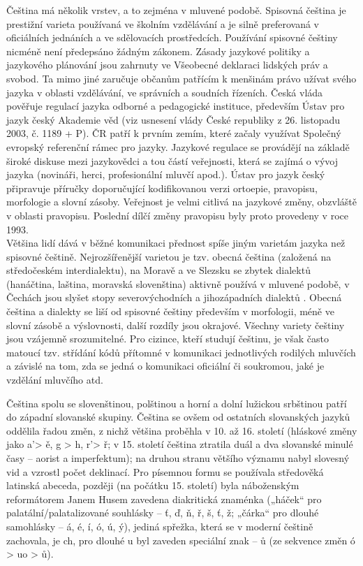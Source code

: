 \begin{multicols}{2}
Čeština má několik vrstev, a to zejména v mluvené podobě. Spisovná čeština je prestižní varieta používaná ve školním vzdělávání a je silně preferovaná v oficiálních jednáních a ve sdělovacích prostředcích. Používání spisovné češtiny nicméně není předepsáno žádným zákonem. Zásady jazykové politiky a jazykového plánování jsou zahrnuty ve Všeobecné deklaraci lidských práv a svobod. Ta mimo jiné zaručuje občanům patřícím k menšinám právo užívat svého jazyka v oblasti vzdělávání, ve správních a soudních řízeních. Česká vláda pověřuje regulací jazyka odborné a pedagogické instituce, především Ústav pro jazyk český Akademie věd (viz usnesení vlády České republiky z 26. listopadu 2003, č. 1189 + P). ČR patří k prvním zemím, které začaly využívat Společný evropský referenční rámec pro jazyky. Jazykové regulace se provádějí na základě široké diskuse mezi jazykovědci a tou částí veřejnosti, která se zajímá o vývoj jazyka (novináři, herci, profesionální mluvčí apod.). Ústav pro jazyk český připravuje příručky doporučující kodifikovanou verzi ortoepie, pravopisu, morfologie a slovní zásoby. Veřejnost je velmi citlivá na jazykové změny, obzvláště v oblasti pravopisu. Poslední dílčí změny pravopisu byly proto provedeny v roce 1993.\\
Většina lidí dává v běžné komunikaci přednost spíše jiným varietám jazyka než spisovné češtině. Nejrozšířenější varietou je tzv. obecná čeština (založená na středočeském interdialektu), na Moravě a ve Slezsku se zbytek dialektů (hanáčtina, laština, moravská slovenština) aktivně používá v mluvené podobě, v Čechách jsou slyšet stopy severovýchodních a jihozápadních dialektů \cite{Note3}. Obecná čeština a dialekty se liší od spisovné češtiny především v morfologii, méně ve slovní zásobě a výslovnosti, další rozdíly jsou okrajové. Všechny variety češtiny jsou vzájemně srozumitelné. Pro cizince, kteří studují češtinu, je však často matoucí tzv. střídání kódů přítomné v komunikaci jednotlivých rodilých mluvčích a závislé na tom, zda se jedná o komunikaci oficiální či soukromou, jaké je vzdělání mluvčího atd.

Čeština spolu se slovenštinou, polštinou a horní a dolní lužickou srbštinou patří do západní slovanské skupiny. Čeština se ovšem od ostatních slovanských jazyků oddělila řadou změn, z nichž většina proběhla v 10. až 16. století (hláskové změny jako a’> ě, g > h, r’> ř; v 15. století čeština ztratila duál a dva slovanské minulé časy – aorist a imperfektum); na druhou stranu většího významu nabyl slovesný vid a vzrostl počet deklinací. Pro písemnou formu se používala středověká latinská abeceda, později (na počátku 15. století) byla náboženským reformátorem Janem Husem zavedena diakritická znaménka („háček“ pro palatální/palatalizované souhlásky – ť, ď, ň, ř, š, ť, ž; „čárka“ pro dlouhé samohlásky – á, é, í, ó, ú, ý), jediná spřežka, která se v moderní češtině zachovala, je ch, pro dlouhé u byl zaveden speciální znak – ů (ze sekvence změn ó > uo > ů).


\end{multicols}
